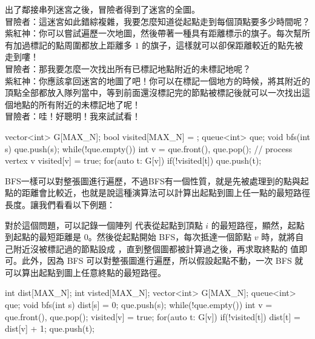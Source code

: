 \documentclass[main.tex]{subfiles}
\begin{document}
出了鄰接串列迷宮之後，冒險者得到了迷宮的全圖。\\

冒險者：這迷宮如此錯綜複雜，我要怎麼知道從起點走到每個頂點要多少時間呢？\\

紫紅神：你可以嘗試遍歷一次地圖，然後帶著一種具有距離標示的旗子。每次幫所有加過標記的點周圍都放上距離多 $1$ 的旗子，這樣就可以卻保距離較近的點先被走到嘍！\\

冒險者：那我要怎麼一次找出所有已標記地點附近的未標記地呢？\\

紫紅神：你應該拿回迷宮的地圖了吧！你可以在標記一個地方的時候，將其附近的頂點全部都放入隊列當中，等到前面還沒標記完的節點被標記後就可以一次找出這個地點的所有附近的未標記地了呢！\\

冒險者：哇！好聰明！我來試試看！\\

\begin{C++}
vector<int> G[MAX_N];
bool visited[MAX_N] = {};
queue<int> que;
void bfs(int s){
    que.push(s);
    while(!que.empty()){
        int v = que.front(), que.pop();
        // process vertex v
        visited[v] = true;
        for(auto t: G[v]){
            if(!visited[t]) que.push(t);
        }
    }
}
\end{C++}

BFS一樣可以對整張圖進行遍歷，不過BFS有一個性質，就是先被處理到的點與起點的距離會比較近，也就是說這種演算法可以計算出起點到圖上任一點的最短路徑長度。讓我們看看以下例題：


對於這個問題，可以記錄一個陣列  代表從起點到頂點 $i$ 的最短路徑，顯然，起點到起點的最短距離是 $0$。然後從起點開始 BFS，每次抵達一個節點 $v$ 時，就將自己附近沒被標記過的節點設成 ，直到整個圖都被計算過之後，再求取終點的  值即可。此外，因為 BFS 可以對整張圖進行遍歷，所以假設起點不動，一次 BFS 就可以算出起點到圖上任意終點的最短路徑。

\begin{C++}
int dist[MAX_N];
int visted[MAX_N];
vector<int> G[MAX_N];
queue<int> que;
void bfs(int s){
    dist[s] = 0;
    que.push(s);
    while(!que.empty()){
        int v = que.front(), que.pop();
        visited[v] = true;
        for(auto t: G[v]){
            if(!visited[t]){
                dist[t] = dist[v] + 1;
                que.push(t);
            }
        }
    }
}
\end{C++}
\end{document}
